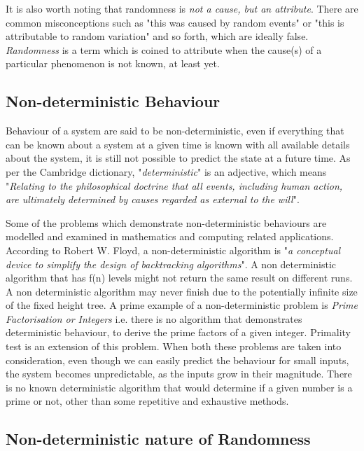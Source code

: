 It is also worth noting that randomness is \textit{not a cause, but an attribute}. There are common misconceptions such as "this was caused by random events" or "this is attributable to random variation" and so forth, which are ideally false. \textit{Randomness} is a term which is coined to attribute when the cause(s) of a particular phenomenon is not known, at least yet. 

\subsection{Non-deterministic Behaviour}\label{lbl_nd_behave}

Behaviour of a system are said to be non-deterministic, even if everything that can be known about a system at a given time is known with all available details about the system, it is still not possible to predict the state at a future time. As per the Cambridge dictionary, "\textit{deterministic}" is an adjective, which means "\textit{Relating to the philosophical doctrine that all events, including human action, are ultimately determined by causes regarded as external to the will}"\cite{web_cambridge_def_determin}.

Some of the problems which demonstrate non-deterministic behaviours are modelled and examined in mathematics and computing related applications. According to Robert W. Floyd, a non-deterministic algorithm is "\textit{a conceptual device to simplify the design of backtracking algorithms}"\cite{art_floyd_non_determin}. A non deterministic algorithm that has f(n) levels might not return the same result on different runs. A non deterministic algorithm may never finish due to the potentially infinite size of the fixed height tree. A prime example of a non-deterministic problem is \textit{Prime Factorisation or Integers} i.e. there is no algorithm that demonstrates deterministic behaviour, to derive the prime factors of a given integer. Primality test is an extension of this problem. When both these problems are taken into consideration, even though we can easily predict the behaviour for small inputs, the system becomes unpredictable, as the inputs grow in their magnitude. There is no known deterministic algorithm that would determine if a given number is a prime or not, other than some repetitive and exhaustive methods.

\subsection{Non-deterministic nature of Randomness}

